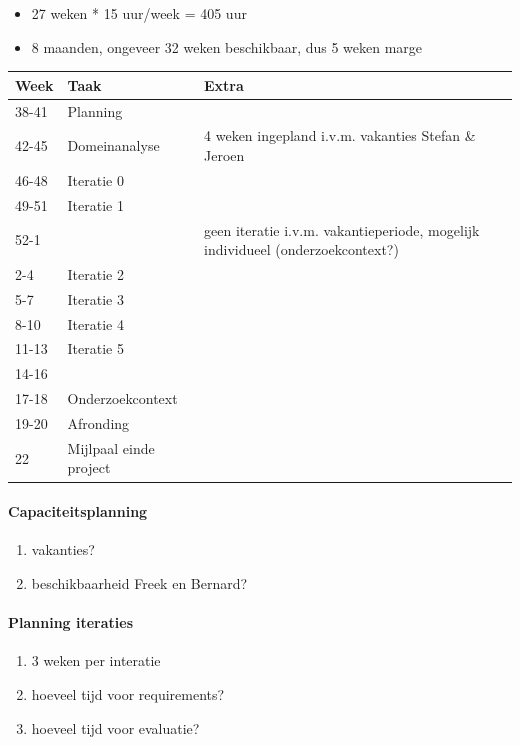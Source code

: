 \begin{itemize}
 \item 27 weken * 15 uur/week = 405 uur
 \item 8 maanden, ongeveer 32 weken beschikbaar, dus 5 weken marge
\end{itemize}



\begin{tabular}{lll}\hline
{\bf Week}    & {\bf Taak}  & {\bf Extra}\\\hline
38-41         & Planning    \\
42-45         & Domeinanalyse & 4 weken ingepland i.v.m. vakanties Stefan \& Jeroen \\
46-48         & Iteratie 0    \\
49-51         & Iteratie 1    \\
52-1          &               & geen iteratie i.v.m. vakantieperiode, mogelijk individueel (onderzoekcontext?) \\
2-4           & Iteratie 2    \\
5-7           & Iteratie 3    \\
8-10          & Iteratie 4    \\
11-13         & Iteratie 5    \\
14-16         &               \\
17-18         & Onderzoekcontext \\
19-20         & Afronding     \\
22            & Mijlpaal einde project

\end{tabular}




\paragraph{Capaciteitsplanning}

\begin{enumerate}
 \item vakanties?
 \item beschikbaarheid Freek en Bernard?
\end{enumerate}

\paragraph{Planning iteraties}
\begin{enumerate}
 \item 3 weken per interatie
 \item hoeveel tijd voor requirements?
 \item hoeveel tijd voor evaluatie?
\end{enumerate}